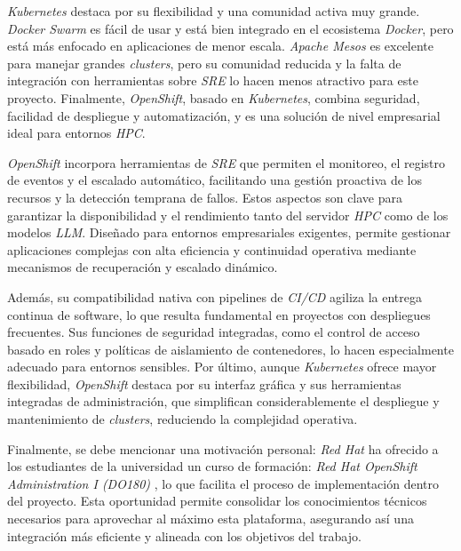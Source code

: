 \textit{Kubernetes} destaca por su flexibilidad y una comunidad activa muy grande. \textit{Docker Swarm} es fácil de usar y está bien integrado en el ecosistema \textit{Docker}, pero está más enfocado en aplicaciones de menor escala. \textit{Apache Mesos} es excelente para manejar grandes \textit{clusters}, pero su comunidad reducida y la falta de integración con herramientas sobre \textit{SRE} lo hacen menos atractivo para este proyecto. Finalmente, \textit{OpenShift}, basado en \textit{Kubernetes}, combina seguridad, facilidad de despliegue y automatización, y es una solución de nivel empresarial ideal para entornos \textit{HPC}.

\textit{OpenShift} incorpora herramientas de \textit{SRE} que permiten el monitoreo, el registro de eventos y el escalado automático, facilitando una gestión proactiva de los recursos y la detección temprana de fallos. Estos aspectos son clave para garantizar la disponibilidad y el rendimiento tanto del servidor \textit{HPC} como de los modelos \textit{LLM}. Diseñado para entornos empresariales exigentes, permite gestionar aplicaciones complejas con alta eficiencia y continuidad operativa mediante mecanismos de recuperación y escalado dinámico.

Además, su compatibilidad nativa con pipelines de \textit{CI/CD} agiliza la entrega continua de software, lo que resulta fundamental en proyectos con despliegues frecuentes. Sus funciones de seguridad integradas, como el control de acceso basado en roles y políticas de aislamiento de contenedores, lo hacen especialmente adecuado para entornos sensibles. Por último, aunque \textit{Kubernetes} ofrece mayor flexibilidad, \textit{OpenShift} destaca por su interfaz gráfica y sus herramientas integradas de administración, que simplifican considerablemente el despliegue y mantenimiento de \textit{clusters}, reduciendo la complejidad operativa.

Finalmente, se debe mencionar una motivación personal: \textit{Red Hat} ha ofrecido a los estudiantes de la universidad un curso de formación: \textit{{Red Hat OpenShift Administration I (DO180)}} \cite{ref33}, lo que facilita el proceso de implementación dentro del proyecto. Esta oportunidad permite consolidar los conocimientos técnicos necesarios para aprovechar al máximo esta plataforma, asegurando así una integración más eficiente y alineada con los objetivos del trabajo.

\newpage
